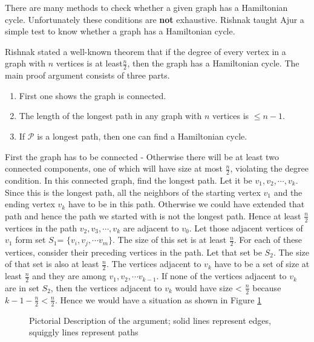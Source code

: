 There are many methods to check whether a given graph has a Hamiltonian cycle. Unfortunately these conditions are \textbf{not} exhaustive. Rishnak taught Ajur a simple test to know whether a graph has a Hamiltonian cycle.

Rishnak stated a well-known theorem that if the degree of every vertex in a graph with $n$ vertices is at least$\frac{n}{2}$, then the graph has a Hamiltonian cycle. The main proof argument consists of three parts.
\begin{enumerate}
    \item First one shows the graph is connected.
    \item The length of the longest path in any graph with $n$ vertices is $\le n-1$.
    \item If $\mathcal{P}$ is a longest path, then one can find a Hamiltonian cycle.
\end{enumerate}


First the graph has to be connected - Otherwise there will be at least two connected components, one of which will have size at most $\frac{n}{2}$, violating the degree condition. In this connected graph, find the longest path. Let it be $v_1,v_2,\cdots, v_k$. Since this is the longest path, all the neighbors of the starting vertex $v_1$ and the ending vertex $v_k$ have  to be in this path. Otherwise we could have extended that path and hence the path we started with is not the longest path. Hence at least $\frac{n}{2}$ vertices in the path $v_2,v_3,\cdots,v_k$ are adjacent to $v_0$. Let those adjacent vertices of $v_1$ form set $S_1$= $\{v_i,v_j,\cdots v_m\}$. The size of this set is at least $\frac{n}{2}$. For each of these vertices, consider their preceding vertices in the path. Let that set be $S_2$. The size of that set is also at least $\frac{n}{2}$. The vertices adjacent to $v_k$ have to be a set of size at least $\frac{n}{2}$ and they are among $v_1,v_2,\cdots v_{k-1}$. If none of the vertices adjacent to $v_k$ are in set $S_2$, then the vertices adjacent to $v_k$ would have size < $\frac{n}{2}$ because $k-1-\frac{n}{2} <\frac{n}{2}$. Hence we would have a situation as shown in Figure \ref{5g100}
\begin{figure}
\begin{center}
\caption{ Pictorial Description of the argument; solid lines represent edges, squiggly lines represent paths} \label{5g100}
\end{center}
\end{figure}
 
